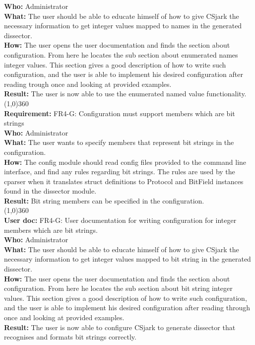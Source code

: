\textbf{Who:} Administrator\\
\textbf{What:} The user should be able to educate himself of how to give CSjark the necessary information to get integer values mapped to names in the generated dissector.\\
\textbf{How:} The user opens the user documentation and finds the section about configuration. From here he locates the sub section about enumerated names integer values. This section gives a good description of how to write such configuration, and the user is able to implement his desired configuration after reading trough once and looking at provided examples.\\
\textbf{Result:} The user is now able to use the enumerated named value functionality.\\
\line(1,0){360}\\
\textbf{Requirement:} FR4-G: Configuration must support members which are bit strings\\
\textbf{Who:} Administrator\\
\textbf{What:} The user wants to specify members that represent bit strings in the configuration.\\
\textbf{How:} The config module should read config files provided to the command line interface, and find any rules regarding bit strings. The rules are used by the cparser when it translates struct definitions to Protocol and BitField instances found in the dissector module.\\
\textbf{Result:} Bit string members can be specified in the configuration.\\
\line(1,0){360}\\
\textbf{User doc:} FR4-G: User documentation for writing configuration for integer members which are bit strings.\\
\textbf{Who:} Administrator\\
\textbf{What:} The user should be able to educate himself of how to give CSjark the necessary information to get integer values mapped to bit string in the generated dissector.\\
\textbf{How:} The user opens the user documentation and finds the section about configuration. From here he locates the sub section about bit string integer values. This section gives a good description of how to write such configuration, and the user is able to implement his desired configuration after reading through once and looking at provided examples.\\
\textbf{Result:} The user is now able to configure CSjark to generate dissector that recognises and formats bit strings correctly.\\
